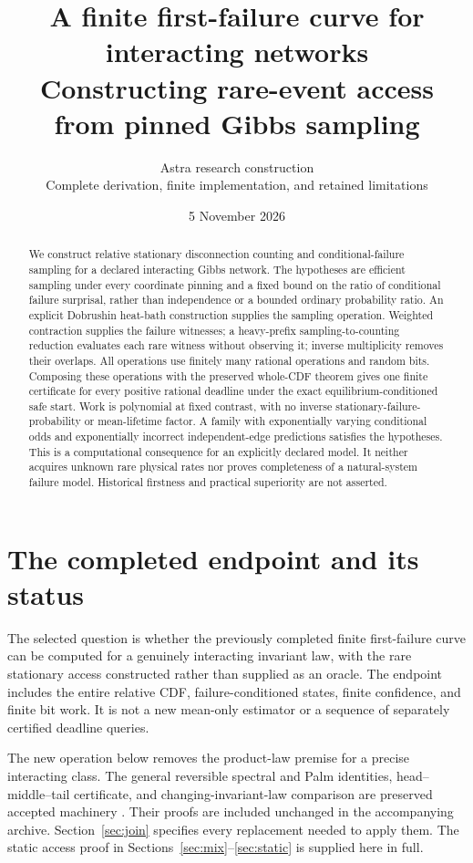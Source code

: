 \documentclass[11pt]{article}
\title{A finite first-failure curve for interacting networks\\[7pt]\large Constructing rare-event access from pinned Gibbs sampling}
\author{Astra research construction\\\small Complete derivation, finite implementation, and retained limitations}
\date{5 November 2026}
\begin{document}
\maketitle
\begin{abstract}
We construct relative stationary disconnection counting and conditional-failure sampling for a declared interacting Gibbs network. The hypotheses are efficient sampling under every coordinate pinning and a fixed bound on the ratio of conditional failure surprisal, rather than independence or a bounded ordinary probability ratio. An explicit Dobrushin heat-bath construction supplies the sampling operation. Weighted contraction supplies the failure witnesses; a heavy-prefix sampling-to-counting reduction evaluates each rare witness without observing it; inverse multiplicity removes their overlaps. All operations use finitely many rational operations and random bits. Composing these operations with the preserved whole-CDF theorem gives one finite certificate for every positive rational deadline under the exact equilibrium-conditioned safe start. Work is polynomial at fixed contrast, with no inverse stationary-failure-probability or mean-lifetime factor. A family with exponentially varying conditional odds and exponentially incorrect independent-edge predictions satisfies the hypotheses. This is a computational consequence for an explicitly declared model. It neither acquires unknown rare physical rates nor proves completeness of a natural-system failure model. Historical firstness and practical superiority are not asserted.
\end{abstract}
\setcounter{tocdepth}{1}
{\small\setlength{\parskip}{0pt}\tableofcontents}
\newpage

\section{The completed endpoint and its status}
The selected question is whether the previously completed finite first-failure curve can be computed for a genuinely interacting invariant law, with the rare stationary access constructed rather than supplied as an oracle. The endpoint includes the entire relative CDF, failure-conditioned states, finite confidence, and finite bit work. It is not a new mean-only estimator or a sequence of separately certified deadline queries.

The new operation below removes the product-law premise for a precise interacting class. The general reversible spectral and Palm identities, head--middle--tail certificate, and changing-invariant-law comparison are preserved accepted machinery \cite{prior}. Their proofs are included unchanged in the accompanying archive. Section~\ref{sec:join} specifies every replacement needed to apply them. The static access proof in Sections~\ref{sec:mix}--\ref{sec:static} is supplied here in full.
\end{document}
